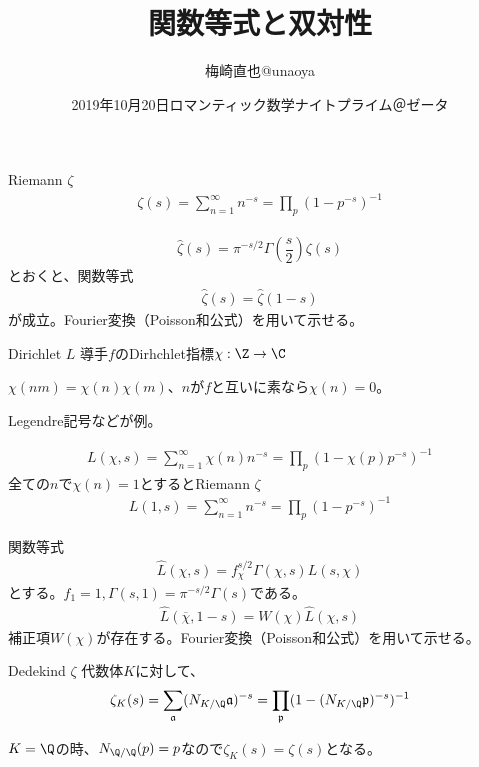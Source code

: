 \documentclass[dvipdfmx]{beamer}
\title{関数等式と双対性}
\author{梅崎直也@unaoya}
\date{2019年10月20日ロマンティック数学ナイトプライム＠ゼータ}
\begin{document}
\begin{frame}
\maketitle
\end{frame}

\begin{frame}{Riemann $\zeta$}
  \begin{align*}
    \zeta(s)=\sum^{\infty}_{n=1}n^{-s}=\prod_p(1-p^{-s})^{-1}
  \end{align*}

  \begin{align*}
    \hat{\zeta}(s)=\pi^{-s/2}\Gamma(\dfrac{s}{2})\zeta(s)
  \end{align*}
  とおくと、関数等式
  \begin{align*}
    \hat{\zeta}(s)=\hat{\zeta}(1-s)
  \end{align*}
  が成立。Fourier変換（Poisson和公式）を用いて示せる。
\end{frame}

\begin{frame}{Dirichlet $L$}
  導手$f$のDirhchlet指標$\chi:\Z\to\C$
  
  $\chi(nm)=\chi(n)\chi(m)$、$n$が$f$と互いに素なら$\chi(n)=0$。

  Legendre記号などが例。
  
  \begin{align*}
    L(\chi,s)=\sum^{\infty}_{n=1}\chi(n)n^{-s}=\prod_p(1-\chi(p)p^{-s})^{-1}
  \end{align*}
  全ての$n$で$\chi(n)=1$とするとRiemann $\zeta$
  \begin{align*}
    L(1,s)=\sum^{\infty}_{n=1}n^{-s}=\prod_p(1-p^{-s})^{-1}
  \end{align*}
\end{frame}

\begin{frame}{関数等式}
  \begin{align*}
    \hat{L}(\chi,s)=f_\chi^{s/2}\Gamma(\chi,s)L(s,\chi)
  \end{align*}
  とする。$f_1=1, \Gamma(s,1)=\pi^{-s/2}\Gamma(s)$である。
  \begin{align*}
    \hat{L}(\overline{\chi},1-s)=W(\chi)\hat{L}(\chi,s)
  \end{align*}
  補正項$W(\chi)$が存在する。Fourier変換（Poisson和公式）を用いて示せる。
\end{frame}

\begin{frame}{Dedekind $\zeta$}
  代数体$K$に対して、
  \begin{align*}
    \zeta_K(s)=\sum_{\mathfrak{a}}(N_{K/\Q}\mathfrak{a})^{-s}=\prod_\mathfrak{p}(1-(N_{K/\Q}\mathfrak{p})^{-s})^{-1}
  \end{align*}


  $K=\Q$の時、$N_{\Q/\Q}(p)=p$なので$\zeta_K(s)=\zeta(s)$となる。
\end{frame}
\end{document}
